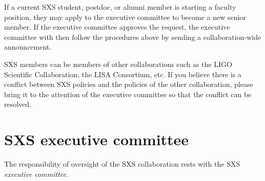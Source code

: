 \documentclass[12pt]{article}
\begin{document}
If a current SXS student, postdoc, or alumni member is starting a
faculty position, they may apply to the executive committee to become
a new senior member.  If the executive committee approves the request,
the executive committee with then follow the procedures above by
sending a collaboration-wide announcement.

SXS members can be members of other collaborations such as the LIGO
Scientific Collaboration, the LISA Consortium, etc.  If you believe
there is a conflict between SXS policies and the policies of the other
collaboration, please bring it to the attention of the executive
committee so that the conflict can be resolved.

\section{SXS executive committee}\label{sec:executive_committee}

The responsibility of oversight of the SXS collaboration rests with
the SXS \emph{executive committee}.
\end{document}
